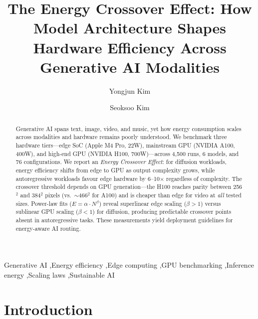 \documentclass[preprint,12pt]{elsarticle}
\begin{document}
\begin{frontmatter}

\title{The Energy Crossover Effect: How Model Architecture Shapes Hardware Efficiency Across Generative AI Modalities}

\author[ajou]{Yongjun Kim}

\author[hannam]{Seoksoo Kim}

\address[ajou]{Department of Software, Ajou University, Suwon, South Korea}
\address[hannam]{Department of Media and Visual Communication, Hannam University, Daejeon, South Korea}

\begin{abstract}
Generative AI spans text, image, video, and music, yet how energy consumption scales across modalities and hardware remains poorly understood. We benchmark three hardware tiers---edge SoC (Apple M4 Pro, 22W), mainstream GPU (NVIDIA A100, 400W), and high-end GPU (NVIDIA H100, 700W)---across 4,500 runs, 6 models, and 76 configurations. We report an \textit{Energy Crossover Effect}: for diffusion workloads, energy efficiency shifts from edge to GPU as output complexity grows, while autoregressive workloads favour edge hardware by 6--10$\times$ regardless of complexity. The crossover threshold depends on GPU generation---the H100 reaches parity between 256$^2$ and 384$^2$ pixels (vs.\ $\sim$466$^2$ for A100) and is cheaper than edge for video at \textit{all} tested sizes. Power-law fits ($E = \alpha \cdot N^\beta$) reveal superlinear edge scaling ($\beta > 1$) versus sublinear GPU scaling ($\beta < 1$) for diffusion, producing predictable crossover points absent in autoregressive tasks. These measurements yield deployment guidelines for energy-aware AI routing.
\end{abstract}

\begin{keyword}
Generative AI \sep Energy efficiency \sep Edge computing \sep GPU benchmarking \sep Inference energy \sep Scaling laws \sep Sustainable AI
\end{keyword}

\end{frontmatter}

\section{Introduction}
\label{sec:introduction}
\end{document}
